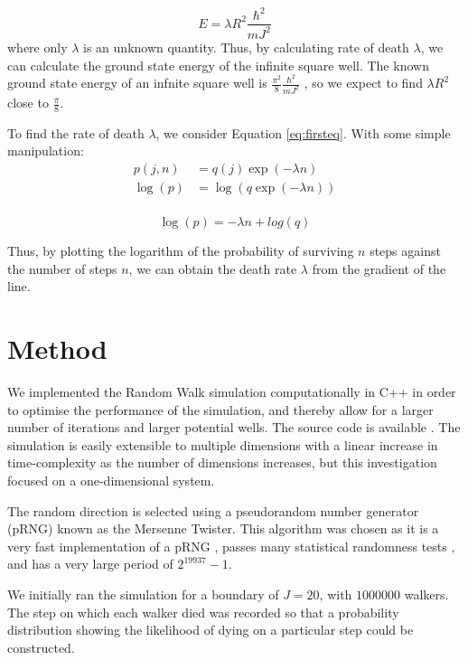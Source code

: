 \documentclass[journal]{IEEEtran}
\begin{document}
\begin{equation}
  E = \lambda R^2 \frac{\hbar^2}{mJ^2}
  \nonumber
\end{equation}
where only $\lambda$ is an unknown quantity. Thus, by calculating rate of death
$\lambda$, we can calculate the ground state energy of the infinite square
well. The known ground state energy of an infnite square well is
$\frac{\pi^2}{8}\frac{\hbar^2}{mJ^2}$ , so we expect to find $\lambda
R^2$ close to $\frac{\pi}{8}$.

To find the rate of death $\lambda$, we consider Equation \ref{eq:firsteq}. With
some simple manipulation:
\begin{equation}
  \begin{split}
    p(j, n) & = q(j) \exp(-\lambda n)\\
    \log(p) & = \log(q \exp(-\lambda n)) \\
  \end{split}
  \nonumber
\end{equation}

\begin{equation}
  \log(p) = -\lambda n + log(q)
  \label{eq:straightline}
\end{equation}

Thus, by plotting the logarithm of the probability of surviving $n$ steps
against the number of steps $n$, we can obtain the death rate $\lambda$ from the
gradient of the line.

\section{Method}
We implemented the Random Walk simulation computationally in
C++ in order to optimise the performance of the simulation, and thereby allow
for a larger number of iterations and larger potential wells. The source code is
available \cite{Pandian}. The simulation is easily extensible to multiple
dimensions with a linear increase in time-complexity as the number of dimensions
increases, but this investigation focused on a one-dimensional system.

The random direction is selected using a pseudorandom number generator (pRNG)
known as the Mersenne Twister. This algorithm was chosen as it is a very fast
implementation of a pRNG \cite{Route2017}, passes many statistical randomness
tests \cite{Bellamy2013}, and has a very large period of $2^{19937}-1$.

We initially ran the simulation for a boundary of $J = 20$, with $1000000$
walkers. The step on which each walker died was recorded so that a probability
distribution showing the likelihood of dying on a particular step could be
constructed.
\end{document}
